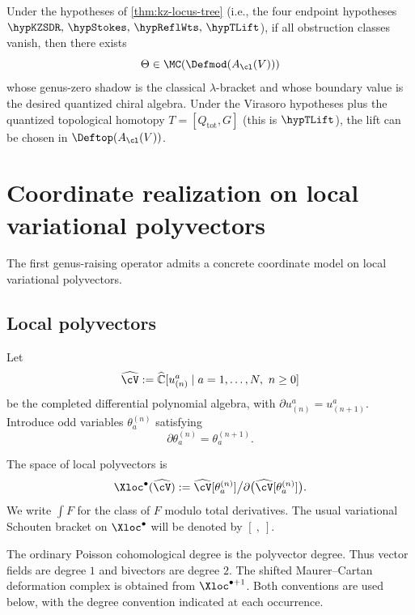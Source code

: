 \begin{corollary}
Under the hypotheses of \cref{thm:kz-locus-tree} (i.e., the four
endpoint hypotheses
$\hypKZSDR,\,\hypStokes,\,\hypReflWts,\,\hypTLift$), if all
obstruction classes vanish, then there exists
\[
\Theta\in \MC(\Defmod(A_{\cl}(V)))
\]
whose genus-zero shadow is the classical $\lambda$-bracket and whose boundary value is the
desired quantized chiral algebra. Under the Virasoro hypotheses plus
the quantized topological homotopy $T=[Q_{\mathrm{tot}},G]$ (this is
$\hypTLift$), the lift
can be chosen in $\Deftop(A_{\cl}(V))$.
\end{corollary}

\section{Coordinate realization on local variational polyvectors}

The first genus-raising operator admits a concrete coordinate model on local variational polyvectors.

\subsection{Local polyvectors}

Let
\[
\widehat{\cV}:=
\widehat{\mathbb C}[u^a_{(n)}\mid a=1,\dots,N,\ n\ge 0]
\]
be the completed differential polynomial algebra, with $\partial u^a_{(n)}=u^a_{(n+1)}$.
Introduce odd variables $\theta_a^{(n)}$ satisfying
\[
\partial \theta_a^{(n)}=\theta_a^{(n+1)}.
\]

\begin{definition}
The space of local polyvectors is
\[
\Xloc^\bullet(\widehat{\cV})
:=
\widehat{\cV}[\theta_a^{(n)}]\big/\partial\big(\widehat{\cV}[\theta_a^{(n)}]\big).
\]
We write $\int F$ for the class of $F$ modulo total derivatives. The usual variational
Schouten bracket on $\Xloc^\bullet$ will be denoted by $[\ ,\ ]$.
\end{definition}

\begin{remark}
The ordinary Poisson cohomological degree is the polyvector degree. Thus vector fields are
degree $1$ and bivectors are degree $2$. The shifted Maurer--Cartan deformation complex is
obtained from $\Xloc^{\bullet+1}$. Both conventions are used below,
with the degree convention indicated at each occurrence.
\end{remark}

